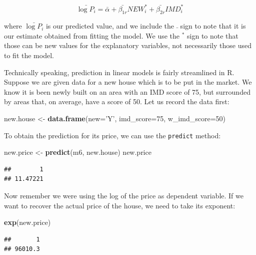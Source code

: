 \documentclass[
]{book}
\newenvironment{Shaded}{\begin{snugshade}}{\end{snugshade}}
\newcommand{\DataTypeTok}[1]{\textcolor[rgb]{0.13,0.29,0.53}{#1}}
\newcommand{\DecValTok}[1]{\textcolor[rgb]{0.00,0.00,0.81}{#1}}
\newcommand{\KeywordTok}[1]{\textcolor[rgb]{0.13,0.29,0.53}{\textbf{#1}}}
\newcommand{\NormalTok}[1]{#1}
\newcommand{\StringTok}[1]{\textcolor[rgb]{0.31,0.60,0.02}{#1}}
\begin{document}
\[
\bar{\log{P_i}} = \bar{\alpha} + \bar{\beta_{1r}} NEW_i^* + \bar{\beta_{2r}} IMD_i^*
\]

where \(\bar{\log{P_i}}\) is our predicted value, and we include the \(\bar{}\) sign to note that it is our estimate obtained from fitting the model. We use the \(^*\) sign to note that those can be new values for the explanatory variables, not necessarily those used to fit the model.

Technically speaking, prediction in linear models is fairly streamlined in R. Suppose we are given data for a new house which is to be put in the market. We know it is been newly built on an area with an IMD score of 75, but surrounded by areas that, on average, have a score of 50. Let us record the data first:

\begin{Shaded}
\begin{Highlighting}[]
\NormalTok{new.house <-}\StringTok{ }\KeywordTok{data.frame}\NormalTok{(}\DataTypeTok{new=}\StringTok{'Y'}\NormalTok{, }\DataTypeTok{imd_score=}\DecValTok{75}\NormalTok{, }\DataTypeTok{w_imd_score=}\DecValTok{50}\NormalTok{)}
\end{Highlighting}
\end{Shaded}

To obtain the prediction for its price, we can use the \texttt{predict} method:

\begin{Shaded}
\begin{Highlighting}[]
\NormalTok{new.price <-}\StringTok{ }\KeywordTok{predict}\NormalTok{(m6, new.house)}
\NormalTok{new.price}
\end{Highlighting}
\end{Shaded}

\begin{verbatim}
##        1 
## 11.47221
\end{verbatim}

Now remember we were using the log of the price as dependent variable. If we want to recover the actual price of the house, we need to take its exponent:

\begin{Shaded}
\begin{Highlighting}[]
\KeywordTok{exp}\NormalTok{(new.price)}
\end{Highlighting}
\end{Shaded}

\begin{verbatim}
##       1 
## 96010.3
\end{verbatim}
\end{document}
